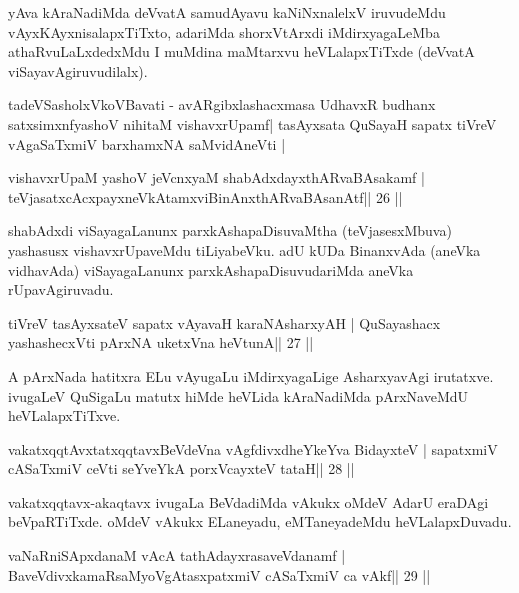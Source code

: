 \begin{artha}
yAva kAraNadiMda deVvatA samudAyavu kaNiNxnalelxV iruvudeMdu vAyxKAyxnisalapxTiTxto, adariMda shorxVtArxdi iMdirxyagaLeMba athaRvuLaLxdedxMdu I muMdina maMtarxvu heVLalapxTiTxde (deVvatA viSayavAgiruvudilalx).
\end{artha}


\begin{shl}
tadeVSasholxVkoVBavati - avARgibxlashacxmasa UdhavxR budhanx
satxsimxnfyashoV  nihitaM vishavxrUpamf| tasAyx\s\s sata QuSayaH
sapatx tiVreV vAgaSaTxmiV barxhamxNA saMvidAneVti |
\end{shl}

\begin{shl}
vishavxrUpaM yashoV jeVcnxyaM shabAdxdayxthARvaBAsakamf |
teVjasatxcAcxpayxneVkAtamxviBinAnxthARvaBAsanAtf\hfill || 26 ||
\end{shl}

\begin{artha}
shabAdxdi viSayagaLanunx parxkAshapaDisuvaMtha (teVjasesxMbuva) yashasusx vishavxrUpaveMdu tiLiyabeVku. adU kUDa BinanxvAda (aneVka vidhavAda) viSayagaLanunx parxkAshapaDisuvudariMda aneVka rUpavAgiruvadu.
\end{artha}

\begin{shl}
tiVreV tasAyx\s\s sateV sapatx vAyavaH karaNAsharxyAH |
QuSayashacx yashashecxVti pArxNA uketxVna heVtunA\hfill || 27 ||
\end{shl}

\begin{artha}
A pArxNada hatitxra ELu vAyugaLu iMdirxyagaLige AsharxyavAgi irutatxve. ivugaLeV QuSigaLu matutx hiMde heVLida kAraNadiMda pArxNaveMdU heVLalapxTiTxve.
\end{artha}

\begin{shl}
vakatxqqtAvxtatxqqtavxBeVdeVna vAgfdivxdheYkeYva BidayxteV |
sapatxmiV cASaTxmiV ceVti seYveYkA porxVcayxteV tataH\hfill || 28 ||
\end{shl}

\begin{artha}
vakatxqqtavx-akaqtavx ivugaLa BeVdadiMda vAkukx oMdeV AdarU eraDAgi beVpaRTiTxde. oMdeV vAkukx ELaneyadu, eMTaneyadeMdu heVLalapxDuvadu.
\end{artha}



\begin{shl}
vaNaRniSApxdanaM vAcA tathA\s\s dayxrasaveVdanamf |
BaveVdivxkamaRsaMyoVgAtasxpatxmiV cASaTxmiV ca vAkf\hfill || 29 ||
\end{shl}

